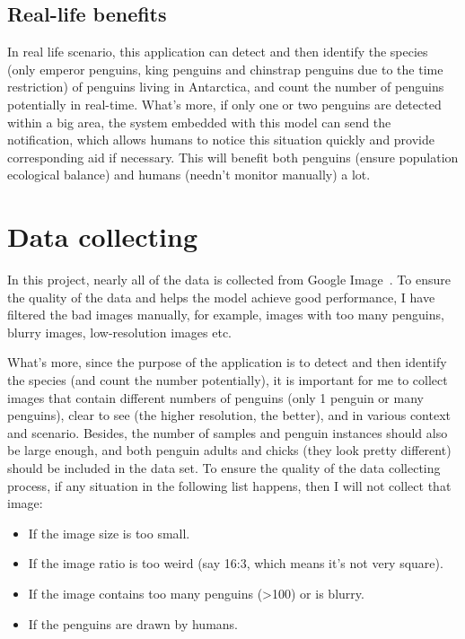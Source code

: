 \documentclass[runningheads]{llncs}
\begin{document}
\subsection{Real-life benefits}
In real life scenario, this application can detect and then identify the species (only emperor penguins, king penguins and chinstrap penguins due to the time restriction) of penguins living in Antarctica, and count the number of penguins potentially in real-time. What's more, if only one or two penguins are detected within a big area, the system embedded with this model can send the notification, which allows humans to notice this situation quickly and provide corresponding aid if necessary. This will benefit both penguins (ensure population ecological balance) and humans (needn't monitor manually) a lot.


\section{Data collecting}
In this project, nearly all of the data is collected from Google Image~\cite{ref_google_image}. To ensure the quality of the data and helps the model achieve good performance, I have filtered the bad images manually, for example, images with too many penguins, blurry images, low-resolution images etc.

What's more, since the purpose of the application is to detect and then identify the species (and count the number potentially), it is important for me to collect images that contain different numbers of penguins (only 1 penguin or many penguins), clear to see (the higher resolution, the better), and in various context and scenario. Besides, the number of samples and penguin instances should also be large enough, and both penguin adults and chicks (they look pretty different) should be included in the data set. To ensure the quality of the data collecting process, if any situation in the following list happens, then I will not collect that image:

\begin{itemize}
  \item If the image size is too small.
  \item If the image ratio is too weird (say 16:3, which means it's not very square).
  \item If the image contains too many penguins (\textgreater{100}) or is blurry.
  \item If the penguins are drawn by humans.
\end{itemize}
\end{document}
